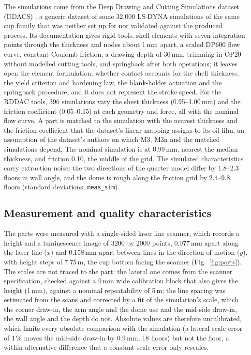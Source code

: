 \documentclass[pdflatex,sn-basic,lineno]{sn-jnl}
\newcommand{\res}[1]{\texttt{#1}}  %
\begin{document}
The simulations come from the Deep Drawing and Cutting Simulations dataset (DDACS) \citep{baum2025ddacs, heinzelmann2025comprehensive}, a generic dataset of some 32,000 LS-DYNA simulations of the same cup family that was neither set up for nor validated against the produced process. Its documentation gives rigid tools, shell elements with seven integration points through the thickness and nodes about 1\,mm apart, a scaled DP600 flow curve, constant Coulomb friction, a drawing depth of 30\,mm, trimming in OP20 without modelled cutting tools, and springback after both operations; it leaves open the element formulation, whether contact accounts for the shell thickness, the yield criterion and hardening law, the blank-holder actuation and the springback procedure, and it does not represent the stroke speed. For the RDDAC tools, 396 simulations vary the sheet thickness (0.95--1.00\,mm) and the friction coefficient (0.05--0.15) at each geometry and force, all with the nominal flow curve. A part is matched to the simulation with the nearest thickness and the friction coefficient that the dataset's linear mapping assigns to its oil film, an assumption of the dataset's authors on which M3, M3n and the matched simulations depend. The nominal simulation is at 0.99\,mm, nearest the median thickness, and friction 0.10, the middle of the grid. The simulated characteristics carry extraction noise: the two directions of the quarter model differ by 1.8--2.3 floors in wall angle, and the dome is rough along the friction grid by 2.4--9.8 floors (standard deviations; \res{meas\_sim}).

\subsection{Measurement and quality characteristics}\label{sec:qcs}

The parts were measured with a single-sided laser line scanner, which records a height and a luminescence image of 3200 by 2000 points, 0.077\,mm apart along the laser line ($x$) and 0.158\,mm apart between lines in the direction of motion ($y$), with height steps of 7.75\,\textmu m, the cup bottom facing the scanner (Fig.~\ref{fig:parts}). The scales are not traced to the part: the lateral one comes from the scanner specification, checked against a 9\,mm wide calibration block that also gives the height (1\,mm), against a nominal repeatability of 5\,\textmu m; the line spacing was estimated from the scans and corrected by a fit of the simulation's scale, which the corner draw-in, the arm angle and the dome use and the mid-side draw-in, the wall angle and the depth do not. Absolute values are therefore uncalibrated, which limits every absolute comparison with the simulation (a lateral scale error of 1\,\% moves the mid-side draw-in by 0.9\,mm, 18 floors) but not the floor, a within-alternative difference that a constant scale error only rescales.
\end{document}
